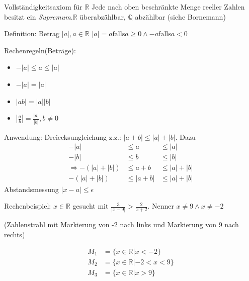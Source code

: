 Vollständigkeitsaxiom für $\mathbb{R}$
Jede nach oben beschränkte Menge reeller Zahlen besitzt ein \emph{Supremum}.$\mathbb{R}$ überabzählbar, $\mathbb{Q}$ abzählbar (siehe Bornemann)

Definition: Betrag $|a|, a \in \mathbb{R}$
$|a|=a \textrm{falls} a \geq 0 \land -a \textrm{falls} a<0$

Rechenregeln(Beträge):
\begin{itemize}
 \item $-|a|\leq a \leq |a|$
 \item $-|a| = |a|$
 \item $|ab| = |a||b|$
 \item $|\frac{a}{b}| = \frac{|a|}{|b|}, b\neq 0$
\end{itemize}

Anwendung: Dreiecksungleichung
z.z.: $|a+b| \leq |a|+|b|$. Dazu
\begin{align*}
-|a|&\leq a &\leq |a| \\
-|b|&\leq b &\leq |b| \\
\Rightarrow -(|a|+|b|)&\leq a+b &\leq |a|+|b| \\
-(|a|+|b|)&\leq |a+b| &\leq |a|+|b|
\end{align*}
Abstandsmessung $|x-a| \leq \epsilon$

Rechenbeispiel:
$x\in \mathbb{R}$ gesucht mit $\frac{3}{|x-9|} > \frac{2}{x+2}$. Nenner $x\neq9 \land x\neq -2$

(Zahlenstrahl mit Markierung von -2 nach links und Markierung von 9 nach rechts)

\begin{align*}
M_1 &= \{x \in \mathbb{R} | x < -2\} \\
M_2 &= \{x \in \mathbb{R} | -2 < x < 9\} \\
M_3 &= \{x \in \mathbb{R} | x > 9\}
\end{align*}

